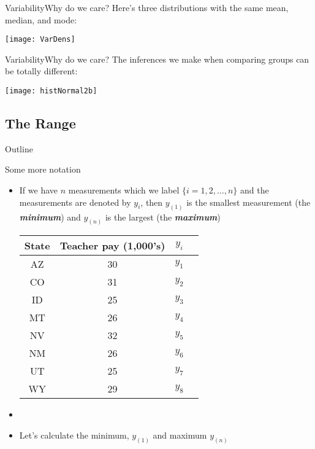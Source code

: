 \documentclass[xcolor=dvipsnames]{beamer}
\begin{document}
\begin{frame}{Variability}{Why do we care?}
Here's three distributions with the same mean, median, and mode:
\begin{center}
	\texttt{[image: VarDens]}
\end{center}
\end{frame}

\begin{frame}{Variability}{Why do we care?}
The inferences we make when comparing groups can be totally different:
\begin{center}
\texttt{[image: histNormal2b]}
\end{center}
\end{frame}

\subsection{The Range}
\begin{frame}{Outline}
	\tableofcontents[currentsection,subsectionstyle=show/shaded/hide]
\end{frame}

\begin{frame}{Some more notation}
	\begin{itemize}
		\item If we have $n$ measurements which we label $\{i = 1, 2, \hdots, n\}$ and the measurements are denoted by $y_i$, then $y_{(1)}$ is the smallest measurement (the \textbf{\emph{minimum}}) and $y_{(n)}$ is the largest (the \textbf{\emph{maximum}})
			\begin{center}
			\begin{tabular}{|c|c|c|c|}
				\hline 
				\textbf{State} & \textbf{Teacher pay (1,000's)} & $y_i$ \\ 
				\hline \hline
				AZ & 30 & $y_1$\\ \hline 
				CO &  31 & $y_2$ \\ \hline 
				ID & 25 & $y_3$ \\  \hline 
				MT &  26 & $y_4$ \\ \hline 
				NV & 32 & $y_5$ \\ \hline 
				NM &  26 & $y_6$\\ \hline 
				UT &  25 & $y_7$\\ \hline 
				WY &  29 & $y_8$\\ \hline 
			\end{tabular} 
		\end{center}
	\item[]
	\item Let's calculate the minimum, $y_{(1)}$ and maximum $y_{(n)}$
	\end{itemize}
\end{frame}
\end{document}
